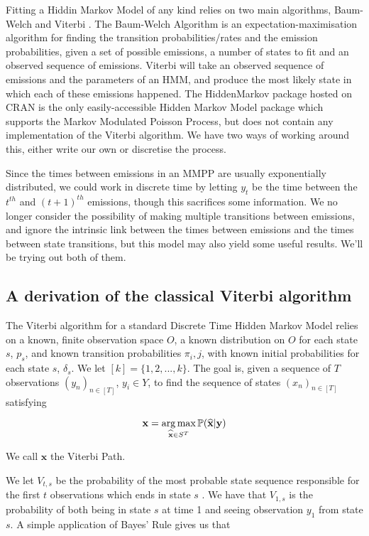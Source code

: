 Fitting a Hiddin Markov Model of any kind relies on two main algorithms, Baum-Welch %
and Viterbi
. The Baum-Welch Algorithm is an expectation-maximisation algorithm for finding the transition probabilities/rates and the emission probabilities, given a set of possible emissions, a number of states to fit and an observed sequence of emissions. Viterbi will take an observed sequence of emissions and the parameters of an HMM, and produce the most likely state in which each of these emissions happened. The HiddenMarkov package hosted on CRAN \cite{hiddenmarkov}
is the only easily-accessible Hidden Markov Model package which supports the Markov Modulated Poisson Process, but does not contain any implementation of the Viterbi algorithm. We have two ways of working around this, either write our own or discretise the process.

Since the times between emissions in an MMPP are usually exponentially distributed, we could work in discrete time by letting $y_t$ be the time between the $t^{th}$ and $(t+1)^{th}$ emissions, though this sacrifices some information. We no longer consider the possibility of making multiple transitions between emissions, and ignore the intrinsic link between the times between emissions and the times between state transitions, but this model may also yield some useful results. We'll be trying out both of them.

\subsection{A derivation of the classical Viterbi algorithm}

The Viterbi algorithm for a standard Discrete Time Hidden Markov Model relies on a known, finite observation space $O$, a known distribution on $O$ for each state $s$, $p_s$, and known transition probabilities $\pi_i,j$, with known initial probabilities for each state $s$, $\delta_s$. We let $[k] = \{1,2,...,k\}$. The goal is, given a sequence of $T$ observations $(y_n)_{n \in [T]}$, $y_i \in Y$, to find the sequence of states $(x_n)_{n \in [T]}$ satisfying

$$
\mathbf{x} = \operatorname*{arg\,max}_{\widehat{\mathbf{x}} \in S^T} \mathbb{P}(\mathbf{\widehat{x}} | \mathbf{y})
$$

We call $\mathbf{x}$ the Viterbi Path.

We let $V_{t,s}$ be the probability of the most probable state sequence responsible for the first $t$ observations which ends in state $s$ %
. We have that $V_{1,s}$ is the probability of both being in state $s$ at time 1 and seeing observation $y_1$ from state $s$. A simple application of Bayes' Rule gives us that


